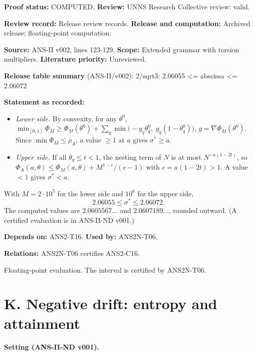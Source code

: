 \documentclass[
  11pt,
]{article}
\providecommand{\tightlist}{%
  \setlength{\itemsep}{0pt}\setlength{\parskip}{0pt}}
\begin{document}
\textbf{Proof status:} COMPUTED. \textbf{Review:} UNNS Research
Collective review: valid.

\textbf{Review record:} Release review records. \textbf{Release and
computation:} Archived release; floating-point computation.

\textbf{Source:} ANS-II v002, lines 123-129. \textbf{Scope:} Extended
grammar with torsion multipliers. \textbf{Literature priority:}
Unreviewed.

\textbf{Release table summary} (ANS-II/v002): 2/sqrt3: 2.06055
\textless= abscissa \textless= 2.06072

\textbf{Statement as recorded:}

\begin{itemize}
\tightlist
\item
  \emph{Lower side.} By convexity, for any \(\theta^0\),
  \(\min_{[0,1]}\Phi_M\ge\Phi_M(\theta^0)+\sum_q\min\big(-g_q\theta^0_q,\;g_q(1-\theta^0_q)\big)\),
  \(g=\nabla\Phi_M(\theta^0)\). Since \(\min\Phi_M\le\rho_A\), a value
  \(\ge1\) at \(a\) gives \(\sigma^\ast\ge a\).
\item
  \emph{Upper side.} If all \(\theta_q\le t<1\), the nesting term of
  \(N\) is at most \(N^{-a(1-2t)}\), so
  \(\Phi_A(a,\theta)\le\Phi_M(a,\theta)+M^{1-c}/(c-1)\) with
  \(c=a(1-2t)>1\). A value \(<1\) gives \(\sigma^\ast<a\).
\end{itemize}

With \(M=2\cdot10^5\) for the lower side and \(10^6\) for the upper
side, \[2.06055\le\sigma^\ast\le2.06072.\] The computed values are
\(2.0605567\ldots\) and \(2.0607189\ldots\), rounded outward. (A
certified evaluation is in ANS-II-ND v001.)

\textbf{Depends on:} ANS2-T16. \textbf{Used by:} ANS2N-T06.

\textbf{Relations:} ANS2N-T06 certifies ANS2-C16.

Floating-point evaluation. The interval is certified by ANS2N-T06.

\hypertarget{k.-negative-drift-entropy-and-attainment}{%
\section{K. Negative drift: entropy and
attainment}\label{k.-negative-drift-entropy-and-attainment}}

\textbf{Setting (ANS-II-ND v001).}
\end{document}
